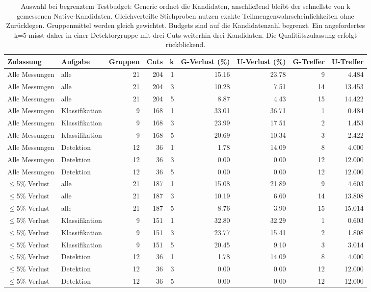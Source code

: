 \begin{table}[t]
\centering
\caption{Auswahl bei begrenztem Testbudget: Generic ordnet die Kandidaten, anschließend bleibt der schnellste von k gemessenen Native-Kandidaten. Gleichverteilte Stichproben nutzen exakte Teilmengenwahrscheinlichkeiten ohne Zurücklegen. Gruppenmittel werden gleich gewichtet. Budgets sind auf die Kandidatenzahl begrenzt. Ein angefordertes k=5 misst daher in einer Detektorgruppe mit drei Cuts weiterhin drei Kandidaten. Die Qualitätszulassung erfolgt rückblickend.}
\label{tab:budget-details}
\begingroup\small\setlength{\tabcolsep}{3pt}
\begin{tabular*}{\textwidth}{@{\extracolsep{\fill}}l l r r r r r r r@{}}
\toprule
Zulassung & Aufgabe & Gruppen & Cuts & k & G-Verlust (\%) & U-Verlust (\%) & G-Treffer & U-Treffer \\
\midrule
Alle Messungen & alle & 21 & 204 & 1 & 15.16 & 23.78 & 9 & 4.484 \\
Alle Messungen & alle & 21 & 204 & 3 & 10.28 & 7.51 & 14 & 13.453 \\
Alle Messungen & alle & 21 & 204 & 5 & 8.87 & 4.43 & 15 & 14.422 \\
Alle Messungen & Klassifikation & 9 & 168 & 1 & 33.01 & 36.71 & 1 & 0.484 \\
Alle Messungen & Klassifikation & 9 & 168 & 3 & 23.99 & 17.51 & 2 & 1.453 \\
Alle Messungen & Klassifikation & 9 & 168 & 5 & 20.69 & 10.34 & 3 & 2.422 \\
Alle Messungen & Detektion & 12 & 36 & 1 & 1.78 & 14.09 & 8 & 4.000 \\
Alle Messungen & Detektion & 12 & 36 & 3 & 0.00 & 0.00 & 12 & 12.000 \\
Alle Messungen & Detektion & 12 & 36 & 5 & 0.00 & 0.00 & 12 & 12.000 \\
$\leq$5\% Verlust & alle & 21 & 187 & 1 & 15.08 & 21.89 & 9 & 4.603 \\
$\leq$5\% Verlust & alle & 21 & 187 & 3 & 10.19 & 6.60 & 14 & 13.808 \\
$\leq$5\% Verlust & alle & 21 & 187 & 5 & 8.76 & 3.90 & 15 & 15.014 \\
$\leq$5\% Verlust & Klassifikation & 9 & 151 & 1 & 32.80 & 32.29 & 1 & 0.603 \\
$\leq$5\% Verlust & Klassifikation & 9 & 151 & 3 & 23.77 & 15.41 & 2 & 1.808 \\
$\leq$5\% Verlust & Klassifikation & 9 & 151 & 5 & 20.45 & 9.10 & 3 & 3.014 \\
$\leq$5\% Verlust & Detektion & 12 & 36 & 1 & 1.78 & 14.09 & 8 & 4.000 \\
$\leq$5\% Verlust & Detektion & 12 & 36 & 3 & 0.00 & 0.00 & 12 & 12.000 \\
$\leq$5\% Verlust & Detektion & 12 & 36 & 5 & 0.00 & 0.00 & 12 & 12.000 \\
\bottomrule
\end{tabular*}
\endgroup
\end{table}
